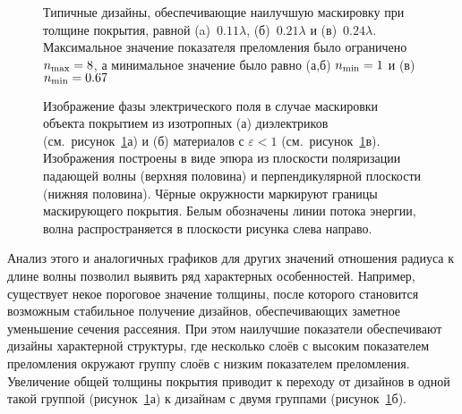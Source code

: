 \begin{figure}[p]
  \begin{minipage}[ht]{0.32\linewidth}
  \end{minipage}
  \hfill
  \begin{minipage}[ht]{0.32\linewidth}
  \end{minipage}
  \hfill
  \begin{minipage}[ht]{0.32\linewidth}
  \end{minipage}
  \caption{Типичные дизайны, обеспечивающие наилучшую маскировку при
    толщине покрытия, равной (a)~$0.11\lambda$, (б)~$0.21\lambda$ и
    (в)~$0.24\lambda$. Максимальное значение показателя преломления
    было ограничено $n_{\rm max}=8$, а минимальное значение было равно
  (а,б) $n_{\rm min}=1$ и (в) $n_{\rm min}=0.67$}
  \label{img:designs}  
\end{figure}
\begin{figure}[p]
  \begin{minipage}[ht]{0.495\linewidth}
  \end{minipage}
  \hfill
  \begin{minipage}[ht]{0.495\linewidth}
  \end{minipage}
  \caption{Изображение фазы электрического поля в случае маскировки
    объекта покрытием из изотропных (а) диэлектриков
    (см.~рисунок~\ref{img:designs}а) и (б) материалов с
    ${\varepsilon <1}$ (см.~рисунок~\ref{img:designs}в). Изображения
    построены в виде эпюра из плоскости поляризации падающей волны
    (верхняя половина) и перпендикулярной плоскости (нижняя
    половина). Чёрные окружности маркируют границы маскирующего
    покрытия. Белым обозначены линии потока энергии, волна
    распространяется в плоскости рисунка слева направо.}
  \label{img:field-phase}  
\end{figure}

Анализ этого и аналогичных графиков для других значений отношения
радиуса к длине волны позволил выявить ряд характерных
особенностей. Например, существует некое пороговое значение толщины,
после которого становится возможным стабильное получение дизайнов,
обеспечивающих заметное уменьшение сечения рассеяния. При этом
наилучшие показатели обеспечивают дизайны характерной структуры, где
несколько слоёв с высоким показателем преломления окружают группу
слоёв с низким показателем преломления. Увеличение общей толщины
покрытия приводит к переходу от дизайнов в одной такой группой
(рисунок~\ref{img:designs}а) к дизайнам с двумя группами
(рисунок~\ref{img:designs}б).


